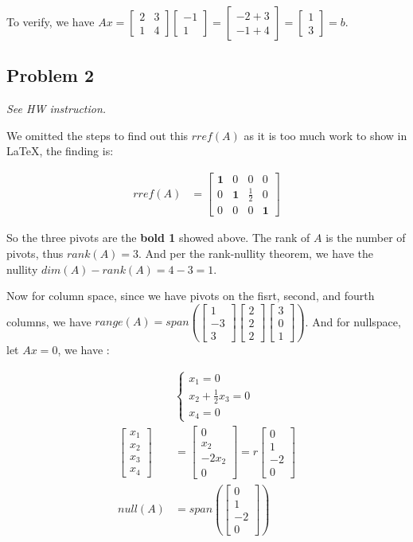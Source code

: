 \documentclass[11pt]{article}
\providecommand{\qbm}[1]{\begin{bmatrix} #1 \end{bmatrix}}
\begin{document}
\noindent To verify, we have $Ax = \qbm{2 & 3 \\ 1 & 4} \qbm{-1 \\ 1} = \qbm{ -2 + 3 \\ -1 + 4} = \qbm{1 \\ 3} = b$.

\subsection*{Problem 2}
\textit{See HW instruction.}\newline

We omitted the steps to find out this $rref(A)$ as it is too much work to show in \LaTeX, the finding is:

\begin{align*}
    rref(A) &= \qbm{\mathbf{1} & 0 & 0 & 0 \\ 0 & \mathbf{1} & \frac{1}{2} & 0 \\ 0 & 0 & 0 & \mathbf{1}}
\end{align*}

So the three pivots are the \textbf{bold 1} showed above. The rank of $A$ is the number of pivots, thus $rank(A) = 3$. And per the rank-nullity theorem, we have the nullity $dim(A) - rank(A) = 4 - 3 = 1$.

Now for column space, since we have pivots on the fisrt, second, and fourth columns, we have $range(A) = span(\qbm{ 1\\ -3 \\ 3} \qbm{2 \\ 2\\ 2} \qbm{3 \\ 0 \\1})$. And for nullspace, let $Ax = 0$, we have :

\begin{align*}
    &\begin{cases}
        x_1 = 0  \\
        x_2 + \frac{1}{2} x_3 = 0 \\
        x_4 = 0
    \end{cases} \\
    \qbm{x_1 \\ x_2 \\ x_3 \\ x_4} &= \qbm{0 \\ x_2 \\ -2 x_2 \\ 0} = r\qbm{0 \\ 1 \\ -2  \\ 0} \\
    null(A) &= span(\qbm{0 \\ 1 \\ -2  \\ 0})
\end{align*}
\end{document}

